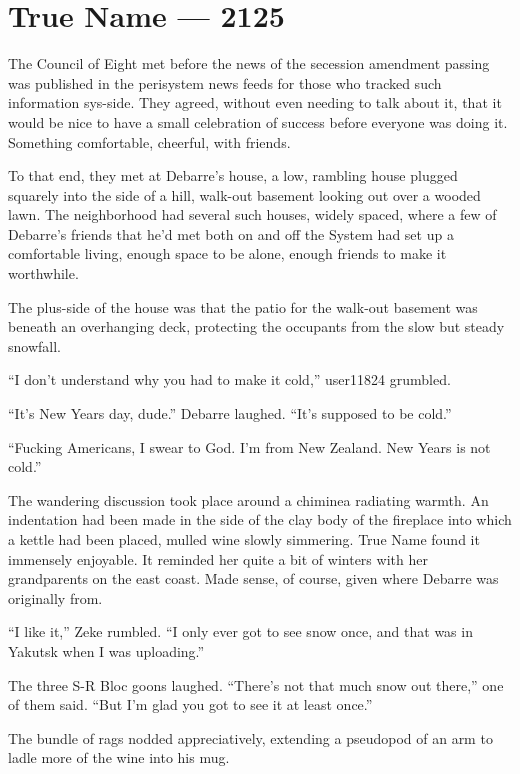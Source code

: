 \hypertarget{true-name-2125}{%
\chapter{True Name — 2125}\label{true-name-2125}}

The Council of Eight met before the news of the secession amendment passing was published in the perisystem news feeds for those who tracked such information sys-side. They agreed, without even needing to talk about it, that it would be nice to have a small celebration of success before everyone was doing it. Something comfortable, cheerful, with friends.

To that end, they met at Debarre's house, a low, rambling house plugged squarely into the side of a hill, walk-out basement looking out over a wooded lawn. The neighborhood had several such houses, widely spaced, where a few of Debarre's friends that he'd met both on and off the System had set up a comfortable living, enough space to be alone, enough friends to make it worthwhile.

The plus-side of the house was that the patio for the walk-out basement was beneath an overhanging deck, protecting the occupants from the slow but steady snowfall.

``I don't understand why you had to make it cold,'' user11824 grumbled.

``It's New Years day, dude.'' Debarre laughed. ``It's supposed to be cold.''

``Fucking Americans, I swear to God. I'm from New Zealand. New Years is not cold.''

The wandering discussion took place around a chiminea radiating warmth. An indentation had been made in the side of the clay body of the fireplace into which a kettle had been placed, mulled wine slowly simmering. True Name found it immensely enjoyable. It reminded her quite a bit of winters with her grandparents on the east coast. Made sense, of course, given where Debarre was originally from.

``I like it,'' Zeke rumbled. ``I only ever got to see snow once, and that was in Yakutsk when I was uploading.''

The three S-R Bloc goons laughed. ``There's not that much snow out there,'' one of them said. ``But I'm glad you got to see it at least once.''

The bundle of rags nodded appreciatively, extending a pseudopod of an arm to ladle more of the wine into his mug.

